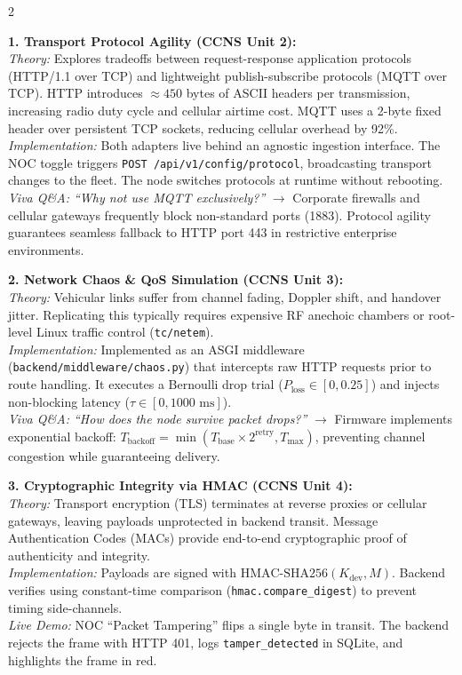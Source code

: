 \documentclass[10pt,a4paper]{article}
\begin{document}
\vspace{-4pt}
\begin{multicols}{2}
\scriptsize

\textbf{\textcolor{cvisblue}{1. Transport Protocol Agility (CCNS Unit 2):}}\\
\textit{Theory:} Explores tradeoffs between request-response application protocols (HTTP/1.1 over TCP) and lightweight publish-subscribe protocols (MQTT over TCP). HTTP introduces $\approx 450$ bytes of ASCII headers per transmission, increasing radio duty cycle and cellular airtime cost. MQTT uses a 2-byte fixed header over persistent TCP sockets, reducing cellular overhead by 92\%.\\
\textit{Implementation:} Both adapters live behind an agnostic ingestion interface. The NOC toggle triggers \texttt{POST /api/v1/config/protocol}, broadcasting transport changes to the fleet. The node switches protocols at runtime without rebooting.\\
\textit{Viva Q\&A: ``Why not use MQTT exclusively?''} $\rightarrow$ Corporate firewalls and cellular gateways frequently block non-standard ports (1883). Protocol agility guarantees seamless fallback to HTTP port 443 in restrictive enterprise environments.

\textbf{\textcolor{cvisred}{2. Network Chaos \& QoS Simulation (CCNS Unit 3):}}\\
\textit{Theory:} Vehicular links suffer from channel fading, Doppler shift, and handover jitter. Replicating this typically requires expensive RF anechoic chambers or root-level Linux traffic control (\texttt{tc/netem}).\\
\textit{Implementation:} Implemented as an ASGI middleware (\texttt{backend/middleware/chaos.py}) that intercepts raw HTTP requests prior to route handling. It executes a Bernoulli drop trial ($P_{\text{loss}} \in [0, 0.25]$) and injects non-blocking latency ($\tau \in [0, 1000\text{ ms}]$).\\
\textit{Viva Q\&A: ``How does the node survive packet drops?''} $\rightarrow$ Firmware implements exponential backoff: $T_{\text{backoff}} = \min(T_{\text{base}} \times 2^{\text{retry}}, T_{\text{max}})$, preventing channel congestion while guaranteeing delivery.

\textbf{\textcolor{cvisred}{3. Cryptographic Integrity via HMAC (CCNS Unit 4):}}\\
\textit{Theory:} Transport encryption (TLS) terminates at reverse proxies or cellular gateways, leaving payloads unprotected in backend transit. Message Authentication Codes (MACs) provide end-to-end cryptographic proof of authenticity and integrity.\\
\textit{Implementation:} Payloads are signed with $\text{HMAC-SHA256}(K_{\text{dev}}, M)$. Backend verifies using constant-time comparison (\texttt{hmac.compare\_digest}) to prevent timing side-channels.\\
\textit{Live Demo:} NOC ``Packet Tampering'' flips a single byte in transit. The backend rejects the frame with HTTP 401, logs \texttt{tamper\_detected} in SQLite, and highlights the frame in red.


\end{multicols}
\end{document}
